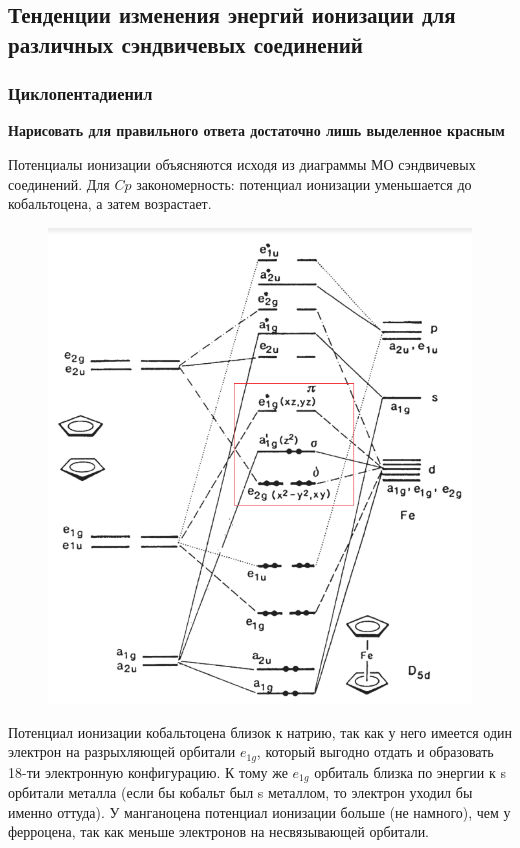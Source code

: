 \subsection{Тенденции изменения энергий ионизации для различных сэндвичевых соединений}
\subsubsection{Циклопентадиенил}
\textbf{Нарисовать для правильного ответа достаточно лишь выделенное красным}

Потенциалы ионизации объясняются исходя из диаграммы МО сэндвичевых соединений. Для $Cp$ закономерность: потенциал ионизации уменьшается до кобальтоцена, а затем возрастает. 


\begin{figure}[H]
\centering
\includegraphics[scale=.600]{images/Cp2Feorb.png}
\end{figure}

Потенциал ионизации кобальтоцена близок к натрию, так как у него имеется один электрон на разрыхляющей орбитали $e_{1g}$, который выгодно отдать и образовать 18-ти электронную конфигурацию. К тому же $e_{1g}$ орбиталь близка по энергии к s орбитали металла (если бы кобальт был s металлом, то электрон уходил бы именно оттуда). 
У манганоцена потенциал ионизации больше (не намного), чем у ферроцена, так как меньше электронов на несвязывающей орбитали.

